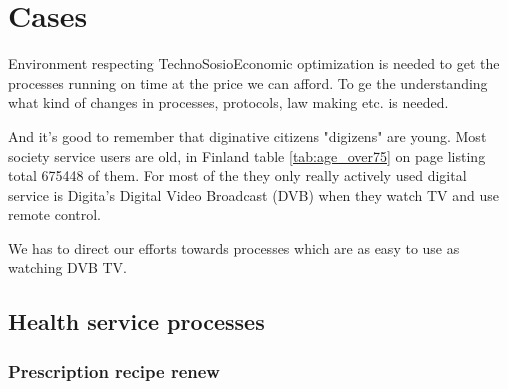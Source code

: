 %
%
%
\part{Cases}

Environment respecting TechnoSosioEconomic optimization is
needed\allowbreak\cite{Pajula2026} to get the processes running on time at the
price we can afford. To ge the understanding what kind of changes in
processes, protocols, law making etc. is needed.

And it's good to remember that diginative citizens "digizens" are young. Most
society service users are old, in Finland table \ref{tab:age_over75} on page
\pageref{tab:age_over75} listing total 675448 of them. For most of the they
only really actively used digital service is Digita's Digital Video Broadcast
(DVB)\allowbreak\cite{DigitaDVB} when they watch TV and use remote control.

\begin{table}
 \begin{center}
  \caption{Number of over 75 year old citisens at 2025}
  \label{tab:age_over75}
 \end{center}
\end{table}

We has to direct our efforts towards processes which are as easy to use as
watching DVB TV.

\chapter{Health service processes}
\label{helth_service_processes}

\section{Prescription recipe renew}
\label{prescription_renew}

